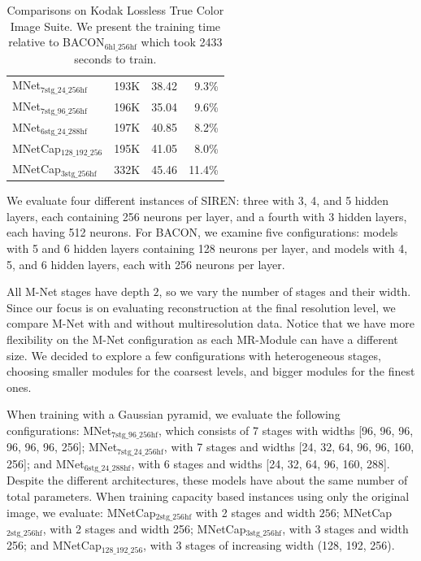 \begin{table}[!h]
\begin{tabular}{|l|r|r|r|}
MNet$_\text{7stg\_24\_256hf}$          & 193K      & 38.42    & 9.3\%       \\
MNet$_\text{7stg\_96\_256hf}$          & 196K      & 35.04    & 9.6\%       \\
MNet$_\text{6stg\_24\_288hf}$          & 197K      & 40.85    & 8.2\%       \\
MNetCap$_\text{128\_192\_256}$ & 195K      & 41.05    & 8.0\%       \\
MNetCap$_\text{3stg\_256hf}$           & 332K      & 45.46    & 11.4\%     \\
\hline
\end{tabular}
\caption{\label{tab:kodak} Comparisons on Kodak Lossless True Color Image Suite. We present the training time relative to BACON$_\text{6hl\_256hf}$ which took 2433 seconds to train.}
\label{t:kodak}
\end{table}


We evaluate four different instances of SIREN: three with 3, 4, and 5 hidden layers, each containing 256 neurons per layer, and a fourth with 3 hidden layers, each having 512 neurons. For BACON, we examine five configurations: models with 5 and 6 hidden layers containing 128 neurons per layer, and models with 4, 5, and 6 hidden layers, each with 256 neurons per layer.

All M-Net stages have depth $2$, so we vary the number of stages and their width. Since our focus is on evaluating reconstruction at the final resolution level, we compare M-Net with and without multiresolution data. Notice that we have more flexibility on the M-Net configuration as each MR-Module can have a different size. We decided to explore a few configurations with heterogeneous stages, choosing smaller modules for the coarsest levels, and bigger modules for the finest ones.

When training with a Gaussian pyramid, we evaluate the following configurations: MNet$_\text{7stg\_96\_256hf}$, which consists of 7 stages with widths [96, 96, 96, 96, 96, 96, 256]; MNet$_\text{7stg\_24\_256hf}$, with 7 stages and widths [24, 32, 64, 96, 96, 160, 256]; and MNet$_\text{6stg\_24\_288hf}$, with 6 stages and widths [24, 32, 64, 96, 160, 288]. Despite the different architectures, these models have about the same number of total parameters. When training capacity based instances using only the original image, we evaluate: MNetCap$_\text{2stg\_256hf}$  with 2 stages and width $256$; MNetCap$_\text{2stg\_256hf}$, with 2 stages and width 256; MNetCap$_\text{3stg\_256hf}$, with 3 stages and width 256; and MNetCap$_\text{128\_192\_256}$, with 3 stages of increasing width (128, 192, 256).

